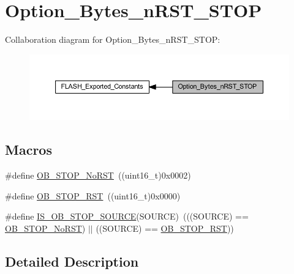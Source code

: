 \hypertarget{group___option___bytes__n_r_s_t___s_t_o_p}{}\section{Option\+\_\+\+Bytes\+\_\+n\+R\+S\+T\+\_\+\+S\+T\+OP}
\label{group___option___bytes__n_r_s_t___s_t_o_p}
Collaboration diagram for Option\+\_\+\+Bytes\+\_\+n\+R\+S\+T\+\_\+\+S\+T\+OP\+:
\nopagebreak
\begin{figure}[H]
\begin{center}
\leavevmode
\includegraphics[width=350pt]{group___option___bytes__n_r_s_t___s_t_o_p}
\end{center}
\end{figure}
\subsection*{Macros}
\begin{DoxyCompactItemize}
\item 
\#define \hyperlink{group___option___bytes__n_r_s_t___s_t_o_p_ga6762d6e4045fec58b49dfc03c1927d51}{O\+B\+\_\+\+S\+T\+O\+P\+\_\+\+No\+R\+ST}~((uint16\+\_\+t)0x0002)
\item 
\#define \hyperlink{group___option___bytes__n_r_s_t___s_t_o_p_gaef92c03b1f279c532bfa13d3bb074b57}{O\+B\+\_\+\+S\+T\+O\+P\+\_\+\+R\+ST}~((uint16\+\_\+t)0x0000)
\item 
\#define \hyperlink{group___option___bytes__n_r_s_t___s_t_o_p_ga131ae3434f300c8317dd6b3b349c7cab}{I\+S\+\_\+\+O\+B\+\_\+\+S\+T\+O\+P\+\_\+\+S\+O\+U\+R\+CE}(S\+O\+U\+R\+CE)~(((S\+O\+U\+R\+CE) == \hyperlink{group___option___bytes__n_r_s_t___s_t_o_p_ga6762d6e4045fec58b49dfc03c1927d51}{O\+B\+\_\+\+S\+T\+O\+P\+\_\+\+No\+R\+ST}) $\vert$$\vert$ ((S\+O\+U\+R\+CE) == \hyperlink{group___option___bytes__n_r_s_t___s_t_o_p_gaef92c03b1f279c532bfa13d3bb074b57}{O\+B\+\_\+\+S\+T\+O\+P\+\_\+\+R\+ST}))
\end{DoxyCompactItemize}


\subsection{Detailed Description}


